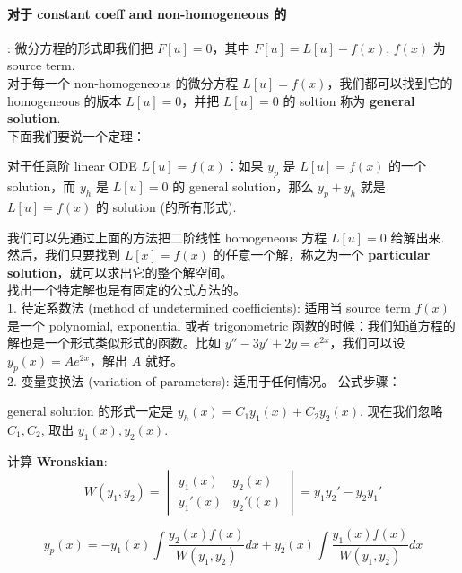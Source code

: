 \documentclass[12pt]{article}
\begin{document}
\paragraph{对于 constant coeff and non-homogeneous 的}: 
微分方程的形式即我们把 $F[u] = 0 $，其中 $F[u] = L[u] - f(x)$, $f(x)$ 为 source term. 
\\对于每一个 non-homogeneous 的微分方程 $L[u] = f(x)$，我们都可以找到它的 homogeneous 的版本 $L[u] = 0$，并把 $L[u] = 0$ 的 soltion 称为 \textbf{general solution}.\\
下面我们要说一个定理：
\begin{theorem}
    对于任意阶 linear ODE $L[u] = f(x)$：如果 $y_p$ 是 $L[u] = f(x)$ 的一个 solution，而 $y_h$ 是 $L[u] = 0$ 的 general solution，那么 $y_p + y_h$ 就是 $L[u] = f(x)$ 的 solution (的所有形式).
\end{theorem}
我们可以先通过上面的方法把二阶线性 homogeneous 方程 $L[u] = 0$ 给解出来.\\
然后，我们只要找到 $L[x] = f(x)$ 的任意一个解，称之为一个 \textbf{particular solution}，就可以求出它的整个解空间。
\\找出一个特定解也是有固定的公式方法的。\\
1. 待定系数法 (method of undetermined coefficients): 适用当 source term $f(x)$ 是一个 polynomial, exponential 或者 trigonometric 函数的时候：我们知道方程的解也是一个形式类似形式的函数。比如 $y'' - 3y' + 2y = e^{2x}$，我们可以设 $y_p(x) = Ae^{2x}$，解出 $A$ 就好。\\
2. 变量变换法 (variation of parameters): 适用于任何情况。
公式步骤：
\begin{compactenumI}
    \item general solution 的形式一定是 $y_h(x) = C_1 y_1(x) + C_2 y_2(x)$. 现在我们忽略 $C_1, C_2$, 取出 $y_1(x), y_2(x)$.
    \item 计算 \textbf{Wronskian}: $$W(y_1, y_2) = \begin{vmatrix} y_1(x) & y_2(x) \\ y_1'(x) & y_2'((x) \end{vmatrix} = y_1y_2' - y_2y_1'$$
    \item $$y_p(x) = -y_1(x) \int{\frac{y_2(x)f(x)}{W(y_1, y_2)} dx} + y_2(x) \int{\frac{y_1(x)f(x)}{W(y_1, y_2)} dx}$$
\end{compactenumI}
\end{document}
